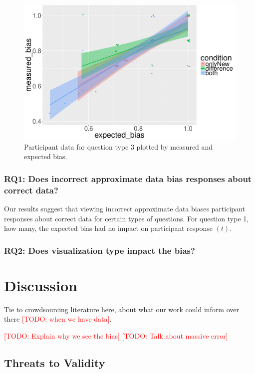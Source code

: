 \documentclass[10pt,journal,compsoc]{IEEEtran}
\newcommand{\note}[2]{\textcolor{#1}{[#2]}}
\newcommand{\todo}[1]{\note{red}{TODO: #1}}
\begin{document}
\begin{figure}[!t]
  \centering
  \includegraphics[width=\columnwidth]{jaccard_precise_jitter.pdf}
  \caption{Participant data for question type 3 plotted by measured and expected bias.}
  \label{figure_q3}
\end{figure}

\subsubsection{RQ1: Does incorrect approximate data bias responses about correct data?}

Our results suggest that viewing incorrect approximate data biases participant responses about correct data for certain types of questions.
For question type 1, how many, the expected bias had no impact on participant response $(t)$.


\subsubsection{RQ2: Does visualization type impact the bias?}

\section{Discussion}\label{sec:discussion}

Tie to crowdsourcing literature here, about what our work could inform over there \todo{when we have data}.

\todo{Explain why we see the bias}
\todo{Talk about massive error}

\subsection{Threats to Validity} %
\end{document}

